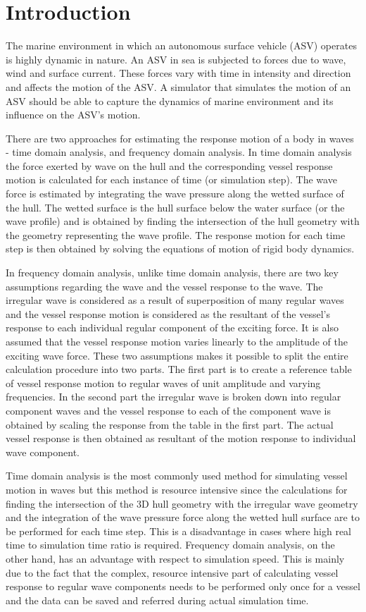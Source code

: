 \section{Introduction}
The marine environment in which an autonomous surface vehicle (ASV) operates is 
highly dynamic in nature. An ASV in sea is subjected to forces due to wave, wind 
and surface current. These forces vary with time in intensity and direction and 
affects the motion of the ASV. A simulator that simulates the motion of an ASV 
should be able to capture the dynamics of marine environment and its influence 
on the ASV's motion.

There are two approaches for estimating the response motion of a body in waves - 
time domain analysis, and frequency domain analysis. In time domain analysis the 
force exerted by wave on the hull and the corresponding vessel response motion 
is calculated for each instance of time (or simulation step). The wave force is
estimated by integrating the wave pressure along the wetted surface of the hull.
The wetted surface is the hull surface below the water surface (or the wave
profile) and is obtained by finding the intersection of the hull geometry with
the geometry representing the wave profile. The response motion for each time
step is then obtained by solving the equations of motion of rigid body dynamics. 

In frequency domain analysis, unlike time domain analysis, there are two key
assumptions regarding the wave and the vessel response to the wave. The 
irregular wave is considered as a result of superposition of many regular waves
and the vessel response motion is considered as the resultant of the vessel's 
response to each individual regular component of the exciting force. It is also 
assumed that the vessel response motion varies linearly to the amplitude of the 
exciting wave force. These two assumptions makes it possible to split the entire
calculation procedure into two parts. The first part is to create a reference 
table of vessel response motion to regular waves of unit amplitude and varying
frequencies. In the second part the irregular wave is broken down into regular
component waves and the vessel response to each of the component wave is 
obtained by scaling the response from the table in the first part. The actual
vessel response is then obtained as resultant of the motion response to
individual wave component.

Time domain analysis is the most commonly used method for simulating vessel 
motion in waves but this method is resource intensive since the calculations for
finding the intersection of the 3D hull geometry with the irregular wave 
geometry and the integration of the wave pressure force along the wetted hull 
surface are to be performed for each time step. This is a disadvantage in cases 
where high real time to simulation time ratio is required. Frequency domain 
analysis, on the other hand, has an advantage with respect to simulation speed. 
This is mainly due to the fact that the complex, resource intensive part of 
calculating vessel response to regular wave components needs to be performed 
only once for a vessel and the data can be saved and referred during actual 
simulation time.   

